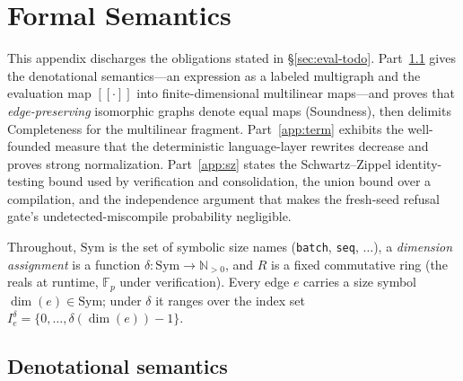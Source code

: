 \documentclass[sigplan,10pt,review]{acmart}
\begin{document}
\appendix
\theoremstyle{remark}\newtheorem{remark}{Remark}[section]

\providecommand{\sem}[1]{\left[\!\left[#1\right]\!\right]}
\newcommand{\Free}{\operatorname{free}}
\newcommand{\Fp}{\mathbb{F}_{p}}
\newcommand{\dg}{\mathsf{d}}

\section{Formal Semantics}\label{app:semantics}

This appendix discharges the obligations stated in
\S\ref{sec:eval-todo}. Part~\ref{app:denot} gives the denotational
semantics---an expression as a labeled multigraph and the evaluation
map $\sem{\cdot}$ into finite-dimensional multilinear maps---and
proves that \emph{edge-preserving} isomorphic graphs denote equal maps
(Soundness), then
delimits Completeness for the multilinear fragment.
Part~\ref{app:term} exhibits the well-founded measure that the
deterministic language-layer rewrites decrease and proves strong
normalization. Part~\ref{app:sz} states the Schwartz--Zippel identity-%
testing bound used by verification and consolidation, the union bound
over a compilation, and the independence argument that makes the
fresh-seed refusal gate's undetected-miscompile probability negligible.

Throughout, $\mathrm{Sym}$ is the set of symbolic size names (\texttt{batch},
\texttt{seq}, $\dots$), a \emph{dimension assignment} is a function
$\delta:\mathrm{Sym}\to\mathbb{N}_{>0}$, and $R$ is a fixed commutative
ring (the reals at runtime, $\Fp$ under verification). Every edge $e$
carries a size symbol $\dim(e)\in\mathrm{Sym}$; under $\delta$ it ranges
over the index set $I_e^{\delta}=\{0,\dots,\delta(\dim(e))-1\}$.

\subsection{Denotational semantics}\label{app:denot}
\end{document}

